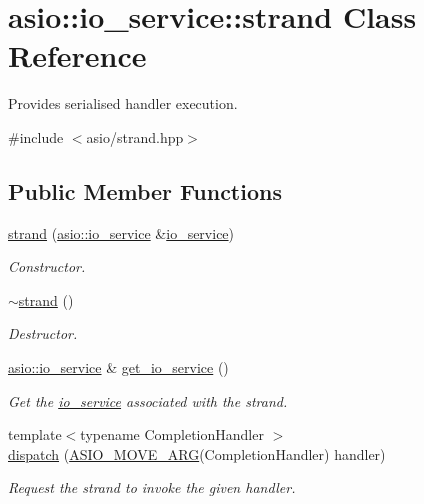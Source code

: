 \hypertarget{classasio_1_1io__service_1_1strand}{}\section{asio\+:\+:io\+\_\+service\+:\+:strand Class Reference}
\label{classasio_1_1io__service_1_1strand}


Provides serialised handler execution.  




{\ttfamily \#include $<$asio/strand.\+hpp$>$}

\subsection*{Public Member Functions}
\begin{DoxyCompactItemize}
\item 
\hyperlink{classasio_1_1io__service_1_1strand_a8f06eed4e6699a26bfcfdbd2feb1b7ff}{strand} (\hyperlink{classasio_1_1io__service}{asio\+::io\+\_\+service} \&\hyperlink{classasio_1_1io__service}{io\+\_\+service})
\begin{DoxyCompactList}\small\item\em Constructor. \end{DoxyCompactList}\item 
\hyperlink{classasio_1_1io__service_1_1strand_a798ddf5fc35c7ca14ff3d2be0bf8dfee}{$\sim$strand} ()
\begin{DoxyCompactList}\small\item\em Destructor. \end{DoxyCompactList}\item 
\hyperlink{classasio_1_1io__service}{asio\+::io\+\_\+service} \& \hyperlink{classasio_1_1io__service_1_1strand_a8fd9a2fd5a257cb39e60532d0fc42405}{get\+\_\+io\+\_\+service} ()
\begin{DoxyCompactList}\small\item\em Get the \hyperlink{classasio_1_1io__service}{io\+\_\+service} associated with the strand. \end{DoxyCompactList}\item 
{\footnotesize template$<$typename Completion\+Handler $>$ }\\\hyperlink{classasio_1_1io__service_1_1strand_a4191e0faa4dc731cda5a68cdd0a236e6}{dispatch} (\hyperlink{group__async__read_ga6d72a97784dde9476c6d93b8904a4967}{A\+S\+I\+O\+\_\+\+M\+O\+V\+E\+\_\+\+A\+R\+G}(Completion\+Handler) handler)
\begin{DoxyCompactList}\small\item\em Request the strand to invoke the given handler. \end{DoxyCompactList}\item 

\end{DoxyCompactItemize}
